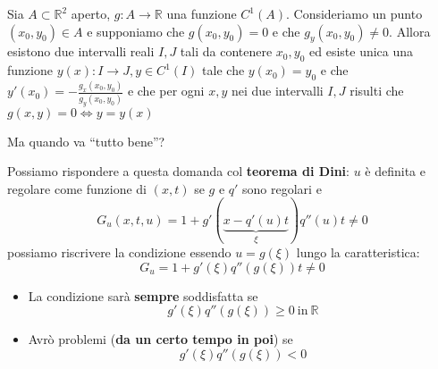 \documentclass[10pt,a4paper,twoside,openright]{book}
\begin{document}
\begin{theorem}
	 Sia $A\subset \mathbb{R}^2$ aperto, $g:A\to \mathbb{R} $ una funzione $C^{1}(A) $. Consideriamo un punto $(x_{0},y_{0})\in A$ e supponiamo che $g(x_{0},y_{0})=0$ e che $g_{y}(x_{0},y_{0})\neq 0$. Allora esistono due intervalli reali $I,J$ tali da contenere $x_{0},y_{0}$ ed esiste unica una funzione $y(x):I\to J, y\in C^{1}(I) $ tale che $y(x_{0})=y_{0}$ e che $y'(x_{0})=-\frac{g_{x}(x_{0},y_{0})}{g_{y}(x_{0},y_{0})}$ e che per ogni $x,y$ nei due intervalli $I,J$ risulti che $g(x,y)=0 \Leftrightarrow y=y(x)$
\end{theorem}

Ma quando va ``tutto bene''?

Possiamo rispondere a questa domanda col \textbf{teorema di Dini}: $\displaystyle u$ è definita e regolare come funzione di $(x,t)$ se $\displaystyle g$ e $\displaystyle q'$ sono regolari e 
\begin{equation*}
	G_{u}(x,t,u) =1+g'(\underbrace{x-q'( u) t}_{\xi }) q''( u) t\neq 0
\end{equation*}
possiamo riscrivere la condizione essendo $\displaystyle u=g( \xi )$ lungo la caratteristica:
\begin{equation}
	\boxed{G_{u} =1+g'( \xi ) q''( g( \xi )) t\neq 0}
\end{equation}
\begin{itemize}
	\item La condizione sarà \textbf{sempre} soddisfatta se\begin{equation*}
	      g'( \xi ) q''( g( \xi )) \geqslant 0\ \text{in} \ \mathbb{R}
		\label{eq:condizione-tutto-bene}
	\end{equation*}
	\item Avrò problemi (\textbf{da un certo tempo in poi}) se\begin{equation*}
	      g'( \xi ) q''( g( \xi )) < 0
	\end{equation*}
\end{itemize}
\end{document}
